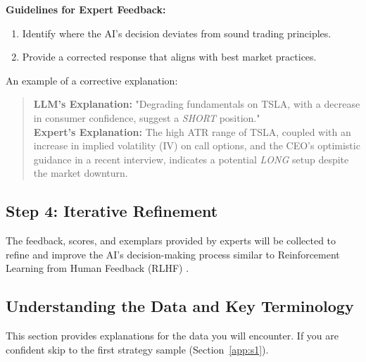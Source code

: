 \documentclass[8pt]{scrartcl}
\begin{document}
\textbf{Guidelines for Expert Feedback:}
\begin{enumerate}
    \item Identify where the AI's decision deviates from sound trading principles.
    \item Provide a corrected response that aligns with best market practices.
\end{enumerate}

An example of a corrective explanation:
\begin{quote}
    \textbf{LLM's Explanation:} "Degrading fundamentals on TSLA, with a decrease in consumer confidence, suggest a \textit{SHORT} position." \\
    \textbf{Expert's Explanation:} The high ATR range of TSLA, coupled with an increase in implied volatility (IV) on call options, and the CEO’s optimistic guidance in a recent interview, indicates a potential \textit{LONG} setup despite the market downturn.
\end{quote}

\subsection{Step 4: Iterative Refinement}

The feedback, scores, and exemplars provided by experts will be collected to refine and improve the AI’s decision-making process similar to Reinforcement Learning from Human Feedback (RLHF) \cite{Retzlaff2024HumanintheLoopRL, Pternea_2024}.

\subsection*{Understanding the Data and Key Terminology}

This section provides explanations for the data you will encounter. If you are confident skip to the first strategy sample (Section~\ref{app:s1}).
\end{document}
